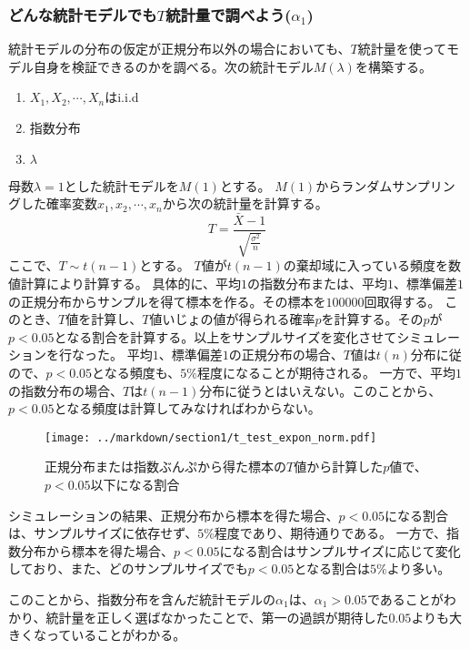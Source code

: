\documentclass[a4paper,11pt,dvipdfmx]{jsarticle}
\begin{document}
\subsubsection{どんな統計モデルでも$T$統計量で調べよう($\alpha_1$)}
統計モデルの分布の仮定が正規分布以外の場合においても、$T$統計量を使ってモデル自身を検証できるのかを調べる。次の統計モデル$M(\lambda)$を構築する。
\begin{enumerate}
    \item $X_1,X_2,\cdots,X_n $はi.i.d
    \item 指数分布
    \item $\lambda$
\end{enumerate}
母数$\lambda=1$とした統計モデルを$M(1)$とする。
$M(1)$からランダムサンプリングした確率変数$x_1,x_2,\cdots,x_n$から次の統計量を計算する。
\begin{equation*}
    T = \frac{\bar{X}-1}{\sqrt{\frac{\sigma^2}{n}}}
\end{equation*}
ここで、$T \sim t(n-1)$とする。
$T$値が$t(n-1)$の棄却域に入っている頻度を数値計算により計算する。
具体的に、平均$1$の指数分布または、平均$1$、標準偏差$1$の正規分布からサンプルを得て標本を作る。その標本を$100000$回取得する。
このとき、$T$値を計算し、$T$値いじょの値が得られる確率$p$を計算する。その$p$が$p<0.05$となる割合を計算する。以上をサンプルサイズを変化させてシミュレーションを行なった。
平均$1$、標準偏差$1$の正規分布の場合、$T$値は$t(n)$分布に従ので、$p<0.05$となる頻度も、$5\%$程度になることが期待される。
一方で、平均$1$の指数分布の場合、$T$は$t(n-1)$分布に従うとはいえない。このことから、$p<0.05$となる頻度は計算してみなければわからない。


\begin{figure}
    \begin{center}
        \texttt{[image: ../markdown/section1/t\_test\_expon\_norm.pdf]}
        \caption{正規分布または指数ぶんぷから得た標本の$T$値から計算した$p$値で、$p<0.05$以下になる割合}
    \end{center}
\end{figure}

シミュレーションの結果、正規分布から標本を得た場合、$p<0.05$になる割合は、サンプルサイズに依存せず、$5\%$程度であり、期待通りである。
一方で、指数分布から標本を得た場合、$p<0.05$になる割合はサンプルサイズに応じて変化しており、また、どのサンプルサイズでも$p<0.05$となる割合は$5\%$より多い。

このことから、指数分布を含んだ統計モデルの$\alpha_1$は、$\alpha_1>0.05$であることがわかり、統計量を正しく選ばなかったことで、第一の過誤が期待した$0.05$よりも大きくなっていることがわかる。
\end{document}
